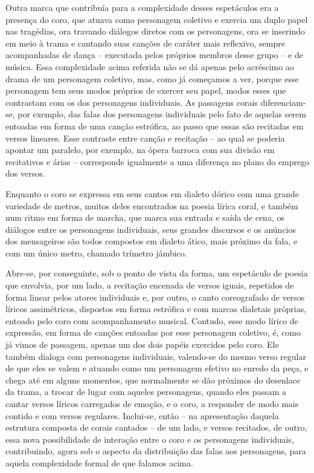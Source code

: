 Outra marca que contribuía para a complexidade desses espetáculos era a
presença do coro, que atuava como personagem coletivo e exercia um duplo
papel nas tragédias, ora travando diálogos diretos com os personagens,
ora se inserindo em meio à trama e cantando suas canções de caráter mais
reflexivo, sempre acompanhadas de dança -- executada pelos próprios
membros desse grupo -- e de música. Essa complexidade acima referida não
se dá apenas pelo acréscimo ao drama de um personagem coletivo, mas,
como já começamos a ver, porque esse personagem tem seus modos próprios
de exercer seu papel, modos esses que contrastam com os dos personagens
individuais. As passagens corais diferenciam-se, por exemplo, das falas
dos personagens individuais pelo fato de aquelas serem entoadas em forma
de uma canção estrófica, ao passo que essas são recitadas em versos
lineares. Esse contraste entre canção e recitação -- ao qual se poderia
apontar um paralelo, por exemplo, na ópera barroca com sua divisão em
recitativos e árias -- corresponde igualmente a uma diferença no plano do
emprego dos versos.

Enquanto o coro se expressa em seus cantos em dialeto dórico com uma
grande variedade de metros, muitos deles encontrados na poesia lírica
coral, e também num ritmo em forma de marcha, que marca sua entrada e
saída de cena, os diálogos entre os personagens individuais, seus
grandes discursos e os anúncios dos mensageiros são todos compostos em
dialeto ático, mais próximo da fala, e com um único metro, chamado
trímetro jâmbico.

Abre-se, por conseguinte, sob o ponto de vista da forma, um espetáculo
de poesia que envolvia, por um lado, a recitação encenada de versos
iguais, repetidos de forma linear pelos atores individuais e, por outro,
o canto coreografado de versos líricos assimétricos, dispostos em forma
estrófica e com marcas dialetais próprias, entoado pelo coro com
acompanhamento musical. Contudo, esse modo lírico de expressão, em forma
de canções entoadas por esse personagem coletivo, é, como já vimos de
passagem, apenas um dos dois papéis exercidos pelo coro. Ele também
dialoga com personagens individuais, valendo-se do mesmo verso regular
de que eles se valem e atuando como um personagem efetivo no enredo da
peça, e chega até em alguns momentos, que normalmente se dão próximos do
desenlace da trama, a trocar de lugar com aqueles personagens, quando
eles passam a cantar versos líricos carregados de emoção, e o coro, a
responder de modo mais contido e com versos regulares. Inclui-se, então --
na apresentação daquela estrutura composta de corais cantados -- de um
lado, e versos recitados, de outro, essa nova possibilidade de interação
entre o coro e os personagens individuais, contribuindo, agora sob o
aspecto da distribuição das falas aos personagens, para aquela
complexidade formal de que falamos acima.

